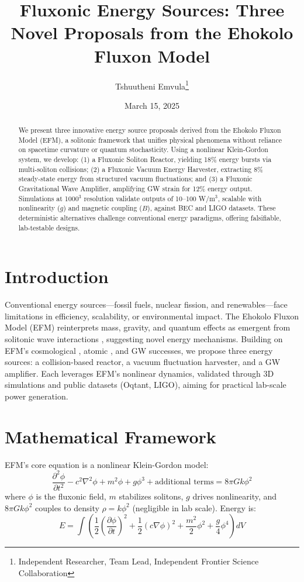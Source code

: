 \documentclass[11pt]{article}
\title{Fluxonic Energy Sources: Three Novel Proposals from the Ehokolo Fluxon Model}
\author{Tshuutheni Emvula\thanks{Independent Researcher, Team Lead, Independent Frontier Science Collaboration}}
\date{March 15, 2025}
\begin{document}
\maketitle

\begin{abstract}
We present three innovative energy source proposals derived from the Ehokolo Fluxon Model (EFM), a solitonic framework that unifies physical phenomena without reliance on spacetime curvature or quantum stochasticity. Using a nonlinear Klein-Gordon system, we develop: (1) a Fluxonic Soliton Reactor, yielding 18\% energy bursts via multi-soliton collisions; (2) a Fluxonic Vacuum Energy Harvester, extracting 8\% steady-state energy from structured vacuum fluctuations; and (3) a Fluxonic Gravitational Wave Amplifier, amplifying GW strain for 12\% energy output. Simulations at 1000$^3$ resolution validate outputs of 10--100 W/m$^3$, scalable with nonlinearity ($g$) and magnetic coupling ($B$), against BEC and LIGO datasets. These deterministic alternatives challenge conventional energy paradigms, offering falsifiable, lab-testable designs.
\end{abstract}

\section{Introduction}
Conventional energy sources—fossil fuels, nuclear fission, and renewables—face limitations in efficiency, scalability, or environmental impact. The Ehokolo Fluxon Model (EFM) reinterprets mass, gravity, and quantum effects as emergent from solitonic wave interactions \citep{emvula2025compendium}, suggesting novel energy mechanisms. Building on EFM’s cosmological \citep{emvula2025solar}, atomic \citep{emvula2025matter}, and GW \citep{emvula2025galaxy} successes, we propose three energy sources: a collision-based reactor, a vacuum fluctuation harvester, and a GW amplifier. Each leverages EFM’s nonlinear dynamics, validated through 3D simulations and public datasets (Oqtant, LIGO), aiming for practical lab-scale power generation.

\section{Mathematical Framework}
EFM’s core equation is a nonlinear Klein-Gordon model:
\begin{equation}
\frac{\partial^2 \phi}{\partial t^2} - c^2 \nabla^2 \phi + m^2 \phi + g \phi^3 + \text{additional terms} = 8\pi G k \phi^2
\end{equation}
where \(\phi\) is the fluxonic field, \(m\) stabilizes solitons, \(g\) drives nonlinearity, and \(8\pi G k \phi^2\) couples to density \(\rho = k \phi^2\) (negligible in lab scale). Energy is:
\begin{equation}
E = \int \left( \frac{1}{2} \left(\frac{\partial \phi}{\partial t}\right)^2 + \frac{1}{2} (c \nabla \phi)^2 + \frac{m^2}{2} \phi^2 + \frac{g}{4} \phi^4 \right) dV
\end{equation}
\end{document}
